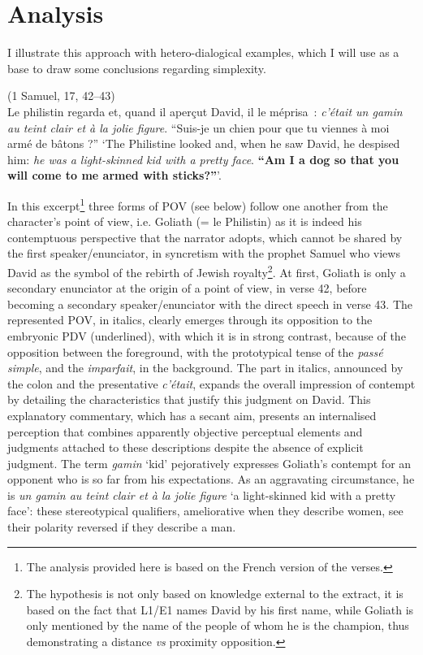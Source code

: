 \documentclass[output=paper]{langscibook}
\begin{document}
\section{Analysis}

I illustrate this approach with hetero-dialogical examples, which I will use as a base to draw some conclusions regarding simplexity. 

\eanoraggedright(1 Samuel, 17, 42--43)\label{ex:06:1}\\
Le philistin regarda et, quand il aperçut David, il le méprisa~: \textit{c’était un gamin au teint clair et à la jolie figure}. “Suis-je un chien pour que tu viennes à moi armé de bâtons ?”
\glt `The Philistine looked and, when he saw David, he despised him: \textit{he was a light-skinned kid with a pretty face}. \textbf{“Am I a dog so that you will come to me armed with sticks?”}'.
\z 


In this excerpt\footnote{The analysis provided here is based on the French version of the verses.} three forms of POV (see below) follow one another from the character's point of view, i.e. Goliath (= le Philistin)  as it is indeed his contemptuous perspective that the narrator adopts, which cannot be shared by the first speaker/enunciator, in syncretism with the prophet Samuel who views David as the symbol of the rebirth of Jewish royalty\footnote{The hypothesis is not only based on knowledge external to the extract, it is based on the fact that L1/E1 names David by his first name, while Goliath is only mentioned by the name of the people of whom he is the champion, thus demonstrating a distance \textit{vs} proximity opposition.}. At first, Goliath is only a secondary enunciator at the origin of a point of view, in verse 42, before becoming a secondary speaker/enunciator with the direct speech in verse 43. The represented POV, in italics, clearly emerges through its opposition to the embryonic PDV (underlined), with which it is in strong contrast, because of the opposition between the foreground, with the prototypical tense of the \textit{passé simple}, and the \textit{imparfait}, in the background. The part in italics, announced by the colon and the presentative \textit{c’était}, expands the overall impression of contempt by detailing the characteristics that justify this judgment on David. This explanatory commentary, which has a secant aim, presents an internalised perception that combines apparently objective perceptual elements and judgments attached to these descriptions despite the absence of explicit judgment. The term \textit{gamin} ‘kid’ pejoratively expresses Goliath's contempt for an opponent who is so far from his expectations. As an aggravating circumstance, he is \textit{un gamin au teint clair et à la jolie figure} ‘a light-skinned kid with a pretty face’: these stereotypical qualifiers, ameliorative when they describe women, see their polarity reversed if they describe a man.
\end{document}
